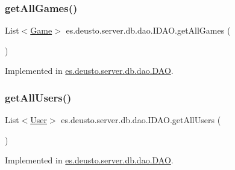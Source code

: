\subsubsection{\texorpdfstring{get\+All\+Games()}{getAllGames()}}
{\footnotesize\ttfamily List$<$\hyperlink{classes_1_1deusto_1_1server_1_1db_1_1data_1_1_game}{Game}$>$ es.\+deusto.\+server.\+db.\+dao.\+I\+D\+A\+O.\+get\+All\+Games (\begin{DoxyParamCaption}{ }\end{DoxyParamCaption})}



Implemented in \hyperlink{classes_1_1deusto_1_1server_1_1db_1_1dao_1_1_d_a_o_af49ed57bdac4dec48ab7616602d12df2}{es.\+deusto.\+server.\+db.\+dao.\+D\+AO}.

\mbox{\label{interfacees_1_1deusto_1_1server_1_1db_1_1dao_1_1_i_d_a_o_a3786445c689f73ccd693c57a629c02de}} 
\subsubsection{\texorpdfstring{get\+All\+Users()}{getAllUsers()}}
{\footnotesize\ttfamily List$<$\hyperlink{classes_1_1deusto_1_1server_1_1db_1_1data_1_1_user}{User}$>$ es.\+deusto.\+server.\+db.\+dao.\+I\+D\+A\+O.\+get\+All\+Users (\begin{DoxyParamCaption}{ }\end{DoxyParamCaption})}



Implemented in \hyperlink{classes_1_1deusto_1_1server_1_1db_1_1dao_1_1_d_a_o_a9c59f6c4bf89f46e305f88a4f8eb96bc}{es.\+deusto.\+server.\+db.\+dao.\+D\+AO}.

\mbox{\label{interfacees_1_1deusto_1_1server_1_1db_1_1dao_1_1_i_d_a_o_aef2783889a572e23bd57c5a2a955599a}} 
